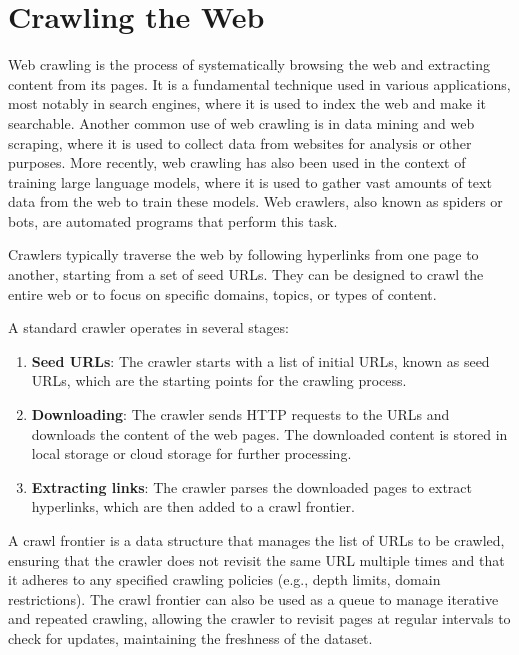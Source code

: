 \section{Crawling the Web}\label{sec:crawling_the_web}

Web crawling is the process of systematically browsing the web and extracting content from its pages.
It is a fundamental technique used in various applications, most notably in search engines, where it is used to index the web and make it searchable.
Another common use of web crawling is in data mining and web scraping, where it is used to collect data from websites for analysis or other purposes.
More recently, web crawling has also been used in the context of training large language models, where it is used to gather vast amounts of text data from the web to train these models.
Web crawlers, also known as spiders or bots, are automated programs that perform this task.

Crawlers typically traverse the web by following hyperlinks from one page to another, starting from a set of seed URLs\cite{kumar2017survey}.
They can be designed to crawl the entire web or to focus on specific domains, topics, or types of content.

A standard crawler operates in several stages\cite{kausar2013web}:
\begin{enumerate}
    \item \textbf{Seed URLs}: The crawler starts with a list of initial URLs, known as seed URLs, which are the starting points for the crawling process.

    \item \textbf{Downloading}: The crawler sends HTTP requests to the URLs and downloads the content of the web pages.
    The downloaded content is stored in local storage or cloud storage for further processing.

    \item \textbf{Extracting links}: The crawler parses the downloaded pages to extract hyperlinks, which are then added to a crawl frontier.
\end{enumerate}

A crawl frontier is a data structure that manages the list of URLs to be crawled, ensuring that the crawler does not revisit the same URL multiple times and that it adheres to any specified crawling policies (e.g., depth limits, domain restrictions).
The crawl frontier can also be used as a queue to manage iterative and repeated crawling, allowing the crawler to revisit pages at regular intervals to check for updates, maintaining the freshness of the dataset\cite{kumar2017survey}.

